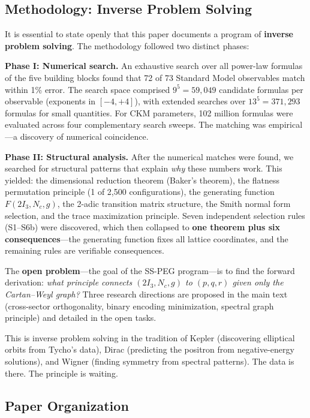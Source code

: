 \subsection{Methodology: Inverse Problem Solving}\label{sec:methodology}

It is essential to state openly that this paper documents a program of \textbf{inverse problem solving}. The methodology followed two distinct phases:

\textbf{Phase I: Numerical search.} An exhaustive search over all power-law formulas of the five building blocks found that 72 of 73 Standard Model observables match within 1\% error. The search space comprised $9^5 = 59{,}049$ candidate formulas per observable (exponents in $[-4, +4]$), with extended searches over $13^5 = 371{,}293$ formulas for small quantities. For CKM parameters, 102 million formulas were evaluated across four complementary search sweeps. The matching was empirical---a discovery of numerical coincidence.

\textbf{Phase II: Structural analysis.} After the numerical matches were found, we searched for structural patterns that explain \textit{why} these numbers work. This yielded: the dimensional reduction theorem (Baker's theorem), the flatness permutation principle (1 of 2,500 configurations), the generating function $F(2I_3, N_c, g)$, the 2-adic transition matrix structure, the Smith normal form selection, and the trace maximization principle. Seven independent selection rules (S1--S6b) were discovered, which then collapsed to \textbf{one theorem plus six consequences}---the generating function fixes all lattice coordinates, and the remaining rules are verifiable consequences.

The \textbf{open problem}---the goal of the SS-PEG program---is to find the forward derivation: \textit{what principle connects $(2I_3, N_c, g)$ to $(p, q, r)$ given only the Cartan--Weyl graph?} Three research directions are proposed in the main text (cross-sector orthogonality, binary encoding minimization, spectral graph principle) and detailed in the open tasks.

This is inverse problem solving in the tradition of Kepler (discovering elliptical orbits from Tycho's data), Dirac (predicting the positron from negative-energy solutions), and Wigner (finding symmetry from spectral patterns). The data is there. The principle is waiting.

\subsection{Paper Organization}\label{sec:organization}

